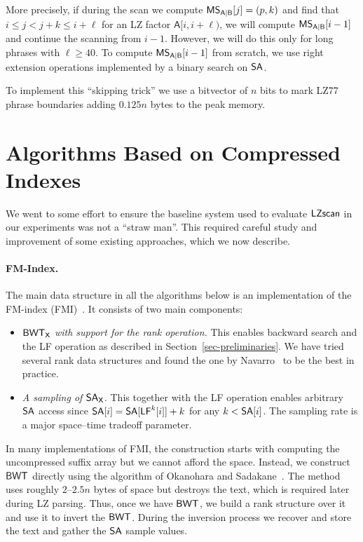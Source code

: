 \documentclass[runningheads]{llncs}
\def\BWT{\mbox{\rm L}}
\def\SA{\mbox{\rm {\sf SA}}}
\def\LF{\mbox{\rm {\sf LF}}}
\def\X{\textsf{X}}
\def\MS{\mbox{\rm {\sf MS}}}
\def\B{\textsf{B}}
\def\A{\textsf{A}}
\def\BWT{\mbox{\rm {\sf BWT}}}
\def\LZSCAN{\mbox{\sf LZscan}}
\begin{document}
More precisely, if during the scan we compute $\MS_{\A|\B}[j]=(p,k)$
and find that $i \leq j < j + k \leq i+\ell$ 
for an LZ factor $\A[i,i+\ell)$, we will compute $\MS_{\A|\B}[i-1]$
and continue the scanning from $i-1$. However, we will do this only
for long phrases with $\ell\ge 40$.  To compute $\MS_{\A|\B}[i-1]$
from scratch, we use right extension operations implemented by a
binary search on $\SA$.

To implement this ``skipping trick'' we use a bitvector of $n$ bits to
mark LZ77 phrase boundaries adding $0.125n$ bytes to the peak memory.

\section{Algorithms Based on Compressed Indexes}
\label{sec-oldalgs}

We went to some effort to ensure the baseline system used to evaluate
$\LZSCAN$ in our experiments was not a ``straw man''. This required
careful study and improvement of some existing approaches, which we
now describe.

\paragraph{FM-Index.} The main data structure in all the algorithms
below is an
implementation of the FM-index (FMI)~\cite{fm2005}. It consists of two
main components:
\begin{itemize}
\item \textit{$\BWT_{\X}$ with support for the rank operation.} This enables
  backward search and the LF operation as described in
  Section~\ref{sec-preliminaries}. We have tried several rank data
  structures and found the one by
  Navarro~\cite[Sect.~7.1]{nav2004} to be the best in practice.
\item \textit{A sampling of $\SA_{\X}$.} This together with the LF
  operation enables arbitrary $\SA$ access since
  $\SA[i]=\SA[\LF^k[i]]+k$ for any $k<\SA[i]$.
  The sampling rate is a major space--time tradeoff parameter.
\end{itemize}
In many implementations of FMI, the construction starts with computing
the uncompressed suffix array but we cannot afford the space.
Instead, we construct $\BWT$ directly using the algorithm of
Okanohara and Sadakane~\cite{os2009}.
The method uses
roughly $2$--$2.5n$ bytes of space
but destroys the text, which is required later during LZ
parsing. Thus, once we have $\BWT$, we build a rank structure over it
and use it to invert the $\BWT$. During the inversion process we
recover and store the text and gather the $\SA$ sample values.
\end{document}
